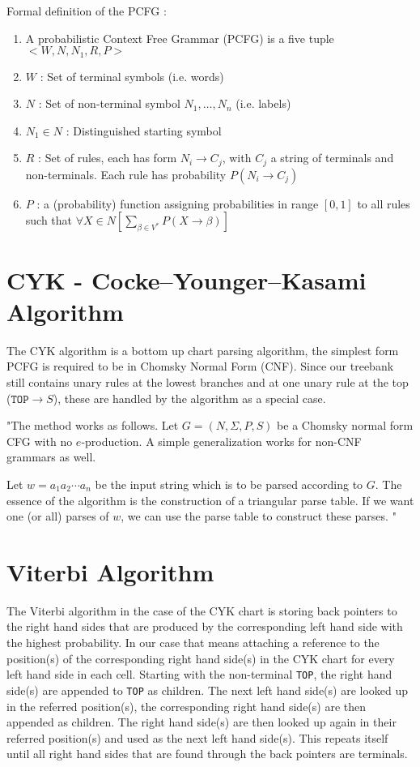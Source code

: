 \documentclass[11pt,twocolumn]{article}
\begin{document}
Formal definition of the PCFG \cite{slides2}:
\begin{enumerate}
\item A probabilistic Context Free Grammar (PCFG) is a five tuple $< W, N, N_1, R, P >$
\item $W$ : Set of terminal symbols (i.e. words)
\item $N$ : Set of non-terminal symbol $N_1, \ldots , N_n$ (i.e. labels)
\item $N_1 \in N$ : Distinguished starting symbol
\item $R$ : Set of rules, each has form $N_i \rightarrow C_j$, with $C_j$ a string of terminals and non-terminals. Each rule has probability $P (N_i \rightarrow C_j )$
\item $P$ : a (probability) function assigning probabilities in range $[0, 1]$ to all rules such that $\forall X \in N \left[ \sum_{\beta \in V^*} P (X \rightarrow \beta) \right]$
\end{enumerate}

\section{CYK - Cocke–Younger–Kasami Algorithm}
The CYK algorithm is a bottom up chart parsing algorithm, the simplest form PCFG is required to be in Chomsky Normal Form (CNF). Since our treebank still contains unary rules at the lowest branches and at one unary rule at the top ($\texttt{TOP} \rightarrow S$), these are handled by the algorithm as a special case.

"The method works as follows. Let $G = (N, \Sigma , P, S)$ be a Chomsky normal form CFG with no $e$-production. A simple generalization works for non-CNF grammars as well. 

Let $w = a_1 a_2 \cdots a_n$ be the input string which is to be parsed according to $G$. The essence of the algorithm is the construction of a triangular parse table. If we want one (or all) parses of $w$, we can use the parse table to construct these parses. \cite{cyk}"




\section{Viterbi Algorithm}
The Viterbi algorithm in the case of the CYK chart is storing back pointers to the right hand sides that are produced by the corresponding left hand side with the highest probability. In our case that means attaching a reference to the position(s) of the corresponding right hand side(s) in the CYK chart for every left hand side in each cell. Starting with the non-terminal \texttt{TOP}, the right hand side(s) are appended to \texttt{TOP} as children. The next left hand side(s) are looked up in the referred position(s), the corresponding right hand side(s) are then appended as children. The right hand side(s) are then looked up again in their referred position(s) and used as the next left hand side(s). This repeats itself until all right hand sides that are found through the back pointers are terminals.
\end{document}
